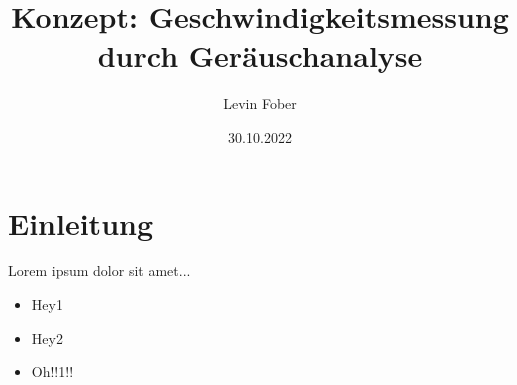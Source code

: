 \documentclass[12pt]{article}
\title{Konzept: Geschwindigkeitsmessung durch Geräuschanalyse}
\author{Levin Fober}
\date{30.10.2022}
\begin{document}
\maketitle

\section{Einleitung}

Lorem ipsum dolor sit amet...

\begin{itemize}
    \item Hey1
    \item Hey2
    \item Oh!!1!!
\end{itemize}
\end{document}
